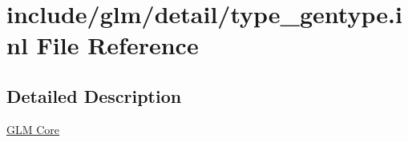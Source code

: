 \hypertarget{type__gentype_8inl}{}\section{include/glm/detail/type\+\_\+gentype.inl File Reference}
\label{type__gentype_8inl}


\subsection{Detailed Description}
\hyperlink{group__core}{G\+LM Core} 